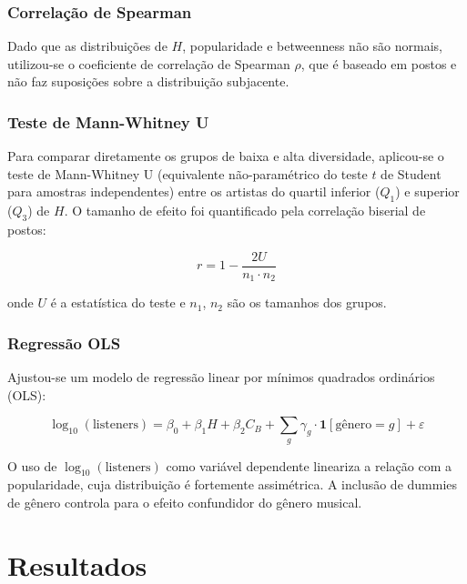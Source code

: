 \documentclass[12pt,a4paper]{article}
\begin{document}
\subsubsection*{Correlação de Spearman}

Dado que as distribuições de $H$, popularidade e betweenness não são normais, utilizou-se o coeficiente de correlação de Spearman $\rho$, que é baseado em postos e não faz suposições sobre a distribuição subjacente.

\subsubsection*{Teste de Mann-Whitney U}

Para comparar diretamente os grupos de baixa e alta diversidade, aplicou-se o teste de Mann-Whitney U (equivalente não-paramétrico do teste $t$ de Student para amostras independentes) entre os artistas do quartil inferior ($Q_1$) e superior ($Q_3$) de $H$. O tamanho de efeito foi quantificado pela correlação biserial de postos:

\begin{equation}
    r = 1 - \frac{2U}{n_1 \cdot n_2}
\end{equation}

onde $U$ é a estatística do teste e $n_1$, $n_2$ são os tamanhos dos grupos.

\subsubsection*{Regressão OLS}

Ajustou-se um modelo de regressão linear por mínimos quadrados ordinários (OLS):

\begin{equation}
    \log_{10}(\text{listeners}) = \beta_0 + \beta_1 H + \beta_2 C_B + \sum_g \gamma_g \cdot \mathbf{1}[\text{gênero} = g] + \varepsilon
\end{equation}

O uso de $\log_{10}(\text{listeners})$ como variável dependente lineariza a relação com a popularidade, cuja distribuição é fortemente assimétrica. A inclusão de dummies de gênero controla para o efeito confundidor do gênero musical.

\section{Resultados}
\end{document}
